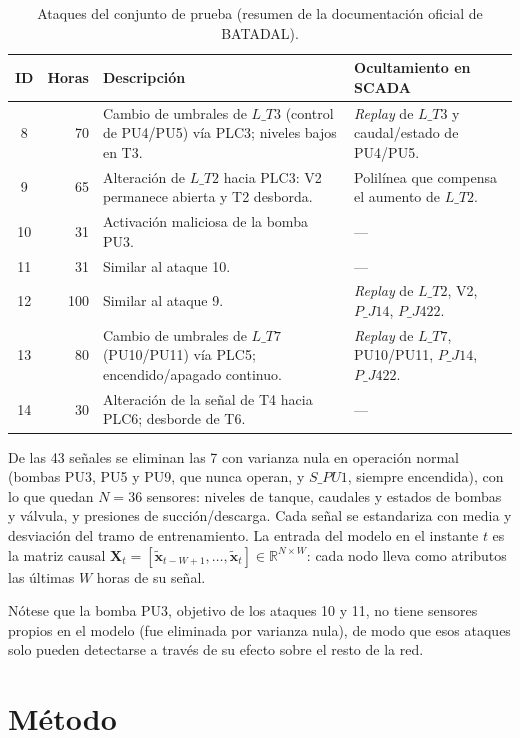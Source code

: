 \documentclass[11pt,a4paper]{article}
\newcommand{\R}{\mathbb{R}}
\newcommand{\X}{\mathbf{X}}
\begin{document}
\begin{table}[t]
\centering
\caption{Ataques del conjunto de prueba (resumen de la documentación oficial de BATADAL).}
\label{tab:ataques}
\small
\begin{tabular}{@{}c r p{6.2cm} p{4.6cm}@{}}
\toprule
ID & Horas & Descripción & Ocultamiento en SCADA \\
\midrule
8  & 70  & Cambio de umbrales de $L\_T3$ (control de PU4/PU5) vía PLC3; niveles bajos en T3. & \emph{Replay} de $L\_T3$ y caudal/estado de PU4/PU5. \\
9  & 65  & Alteración de $L\_T2$ hacia PLC3: V2 permanece abierta y T2 desborda. & Polilínea que compensa el aumento de $L\_T2$. \\
10 & 31  & Activación maliciosa de la bomba PU3. & --- \\
11 & 31  & Similar al ataque 10. & --- \\
12 & 100 & Similar al ataque 9. & \emph{Replay} de $L\_T2$, V2, $P\_J14$, $P\_J422$. \\
13 & 80  & Cambio de umbrales de $L\_T7$ (PU10/PU11) vía PLC5; encendido/apagado continuo. & \emph{Replay} de $L\_T7$, PU10/PU11, $P\_J14$, $P\_J422$. \\
14 & 30  & Alteración de la señal de T4 hacia PLC6; desborde de T6. & --- \\
\bottomrule
\end{tabular}
\end{table}

De las 43 señales se eliminan las 7 con varianza nula en operación normal (bombas
PU3, PU5 y PU9, que nunca operan, y $S\_PU1$, siempre encendida), con lo que quedan
$N=36$ sensores: niveles de tanque, caudales y estados de bombas y válvula, y
presiones de succión/descarga. Cada señal se estandariza con media y desviación del
tramo de entrenamiento. La entrada del modelo en el instante $t$ es la matriz
causal $\X_t=[\tilde{\mathbf{x}}_{t-W+1},\dots,\tilde{\mathbf{x}}_t]\in\R^{N\times W}$:
cada nodo lleva como atributos las últimas $W$ horas de su señal.

Nótese que la bomba PU3, objetivo de los ataques 10 y 11, no tiene sensores propios
en el modelo (fue eliminada por varianza nula), de modo que esos ataques solo pueden
detectarse a través de su efecto sobre el resto de la red.

\section{Método}
\end{document}

